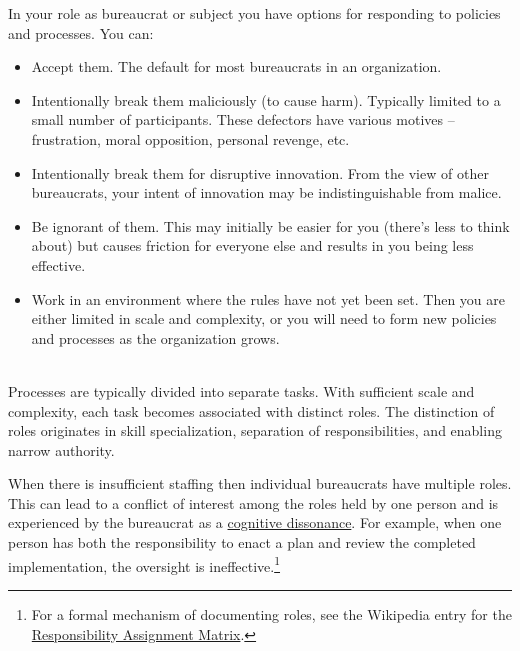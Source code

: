 In your role as bureaucrat or subject you have options for responding to policies and processes. You can:
\begin{itemize}
    \item Accept them. The default for most bureaucrats in an  organization.
    \item Intentionally break them maliciously (to cause harm). Typically limited to a small number of participants. These defectors have various motives -- frustration, moral opposition, personal revenge, etc.
    \item Intentionally break them for disruptive innovation. 
    From the view of other bureaucrats, your intent of innovation may be indistinguishable from malice. 
    \item Be ignorant of them. This may initially be easier for you (there's less to think about) but causes friction for everyone else and results in you being less effective. 
    \item Work in an environment where the rules have not yet been set. Then you are either limited in scale and complexity, or you will need to form new policies and processes as the organization grows.
\end{itemize}

\ \\

Processes are typically divided into separate tasks. With sufficient scale and complexity, each task becomes associated with distinct roles. The distinction of roles originates in skill specialization, separation of responsibilities, and enabling narrow authority. 

When there is insufficient staffing then individual bureaucrats have multiple roles. This can lead to a conflict of interest among the roles held by one person and is experienced by the bureaucrat as a \href{https://en.wikipedia.org/wiki/Cognitive_dissonance}{cognitive dissonance}. 
For example, when one person has both the responsibility to enact a plan and review the completed implementation, the oversight is ineffective.\footnote{For a formal mechanism of documenting roles, see the Wikipedia entry for the 
\href{https://en.wikipedia.org/wiki/Responsibility_assignment_matrix}{Responsibility Assignment Matrix}.
}

